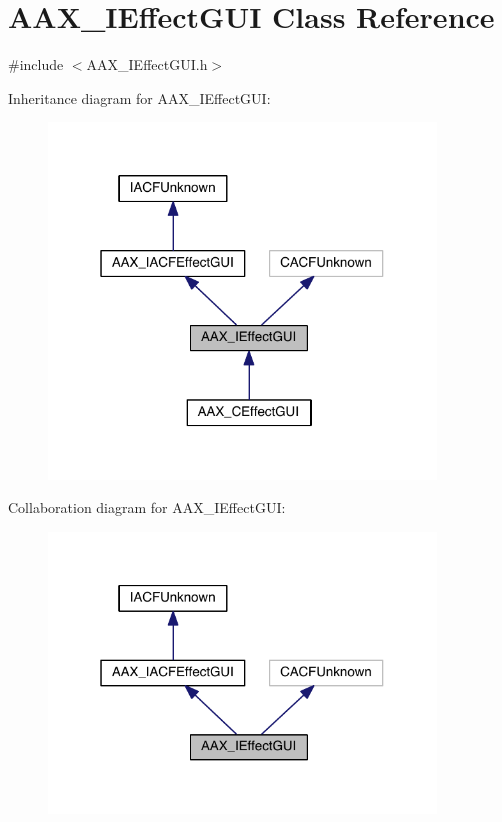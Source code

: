 \hypertarget{a00098}{}\section{A\+A\+X\+\_\+\+I\+Effect\+G\+U\+I Class Reference}
\label{a00098}


{\ttfamily \#include $<$A\+A\+X\+\_\+\+I\+Effect\+G\+U\+I.\+h$>$}



Inheritance diagram for A\+A\+X\+\_\+\+I\+Effect\+G\+U\+I\+:
\nopagebreak
\begin{figure}[H]
\begin{center}
\leavevmode
\includegraphics[width=292pt]{a00627}
\end{center}
\end{figure}


Collaboration diagram for A\+A\+X\+\_\+\+I\+Effect\+G\+U\+I\+:
\nopagebreak
\begin{figure}[H]
\begin{center}
\leavevmode
\includegraphics[width=292pt]{a00628}
\end{center}
\end{figure}


